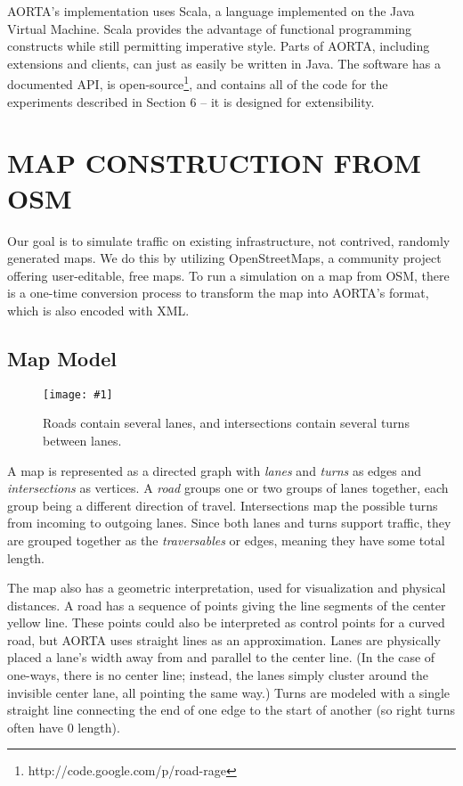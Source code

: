 \documentclass[letterpaper, 10 pt, conference]{ieeeconf}  %
\newcommand{\pix}[3]{
  \begin{figure}[h]
    \centering \texttt{[image: \#1]}
    \caption{#2}
  \end{figure}
}
\begin{document}
AORTA's implementation uses Scala, a language implemented on the Java Virtual
Machine. Scala provides the advantage of functional programming constructs while
still permitting imperative style. Parts of AORTA, including extensions and clients, can
just as easily be written in Java. The software has a documented API, is
open-source\footnote{http://code.google.com/p/road-rage}, and contains all of
the code for the experiments described in Section 6 -- it is designed for
extensibility.


\section{MAP CONSTRUCTION FROM OSM}

Our goal is to simulate traffic on existing infrastructure, not contrived,
randomly generated maps. We do this by utilizing OpenStreetMaps, a community
project offering user-editable, free maps. To run a simulation on a map from
OSM, there is a one-time conversion process to transform the map into AORTA's
format, which is also encoded with XML.

\subsection{Map Model}

\pix{map_model.png}
    {Roads contain several lanes, and intersections contain several turns
     between lanes.}
    {scale=0.5}


A map is represented as a directed graph with \emph{lanes} and \emph{turns} as edges and
\emph{intersections} as vertices. A \emph{road} groups one or two groups of
lanes together, each group being a different direction of travel. Intersections
map the possible turns from incoming to outgoing lanes. Since both lanes and
turns support traffic, they are grouped together as the \emph{traversables} or
edges, meaning they have some total length.

The map also has a geometric interpretation, used for visualization and physical
distances. A road has a sequence of points giving the line segments of the
center yellow line. These points could also be interpreted as control points for
a curved road, but AORTA uses straight lines as an approximation. Lanes are
physically placed a lane's width away from and parallel to the center line. (In
the case of one-ways, there is no center line; instead, the lanes simply cluster
around the invisible center lane, all pointing the same way.) Turns are modeled
with a single straight line connecting the end of one edge to the start of
another (so right turns often have $0$ length). 
\end{document}
